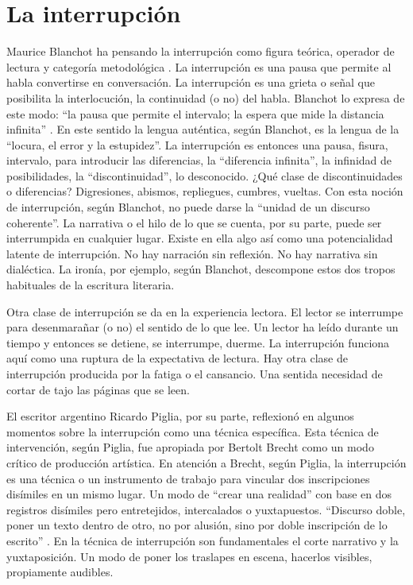 \documentclass[
  spanish,
  11pt,
  a4paper,
]{scrbook}
\begin{document}
\section*{La interrupción}\label{la-interrupciuxf3n}


Maurice Blanchot ha pensando la interrupción como figura teórica,
operador de lectura y categoría metodológica \autocite{Blanchot2008}. La
interrupción es una pausa que permite al habla convertirse en
conversación. La interrupción es una grieta o señal que posibilita la
interlocución, la continuidad (o no) del habla. Blanchot lo expresa de
este modo: ``la pausa que permite el intervalo; la espera que mide la
distancia infinita'' \autocite[98]{Blanchot2008}. En este sentido la
lengua auténtica, según Blanchot, es la lengua de la ``locura, el error
y la estupidez''. La interrupción es entonces una pausa, fisura,
intervalo, para introducir las diferencias, la ``diferencia infinita'',
la infinidad de posibilidades, la ``discontinuidad'', lo desconocido.
¿Qué clase de discontinuidades o diferencias? Digresiones, abismos,
repliegues, cumbres, vueltas. Con esta noción de interrupción, según
Blanchot, no puede darse la ``unidad de un discurso coherente''. La
narrativa o el hilo de lo que se cuenta, por su parte, puede ser
interrumpida en cualquier lugar. Existe en ella algo así como una
potencialidad latente de interrupción. No hay narración sin reflexión.
No hay narrativa sin dialéctica. La ironía, por ejemplo, según Blanchot,
descompone estos dos tropos habituales de la escritura literaria.

Otra clase de interrupción se da en la experiencia lectora. El lector se
interrumpe para desenmarañar (o no) el sentido de lo que lee. Un lector
ha leído durante un tiempo y entonces se detiene, se interrumpe, duerme.
La interrupción funciona aquí como una ruptura de la expectativa de
lectura. Hay otra clase de interrupción producida por la fatiga o el
cansancio. Una sentida necesidad de cortar de tajo las páginas que se
leen.

El escritor argentino Ricardo Piglia, por su parte, reflexionó en
algunos momentos sobre la interrupción como una técnica específica. Esta
técnica de intervención, según Piglia, fue apropiada por Bertolt Brecht
como un modo crítico de producción artística. En atención a Brecht,
según Piglia, la interrupción es una técnica o un instrumento de trabajo
para vincular dos inscripciones disímiles en un mismo lugar. Un modo de
``crear una realidad'' con base en dos registros disímiles pero
entretejidos, intercalados o yuxtapuestos. ``Discurso doble, poner un
texto dentro de otro, no por alusión, sino por doble inscripción de lo
escrito'' \autocite[294]{Piglia2015a}. En la técnica de interrupción son
fundamentales el corte narrativo y la yuxtaposición. Un modo de poner
los traslapes en escena, hacerlos visibles, propiamente audibles.
\end{document}
